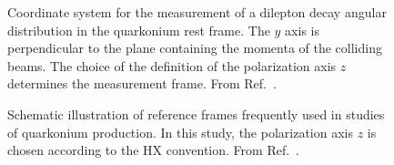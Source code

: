\begin{figure}[h]
\centering
{}
\caption{Coordinate system for the measurement of a
dilepton decay angular distribution in the quarkonium rest frame.
The $y$ axis is perpendicular to the plane containing the momenta of the colliding beams.
The choice of the definition of the polarization axis $z$ determines the measurement frame.
From Ref.~\cite{bib:Faccioli-EPJC}.}
\label{fig:coordinates}
\end{figure}

\begin{figure}[h]
\centering
{}
\caption{Schematic illustration of reference frames frequently used in 
studies of quarkonium production.
In this study, the polarization axis $z$ is chosen according to the HX convention. 
From Ref.~\cite{bib:Faccioli-EPJC}.}
\label{fig:frames}
\end{figure}

